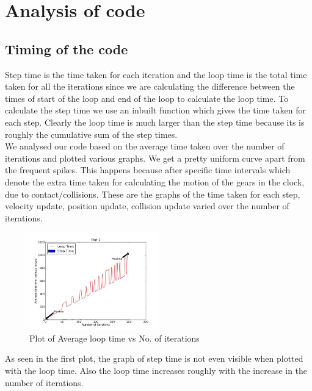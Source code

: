 \documentclass[10pt]{article} \usepackage[a4paper,left=0.8in,right=0.8in,top=0.4in,bottom=0.8in]{geometry} \usepackage{graphicx}
\begin{document}
\section{Analysis of code}
\subsection{Timing of the code}
Step time is the time taken for each iteration and the loop time is the total time taken for all the iterations since we are calculating the difference between the times of start of the loop and end of the loop to calculate the loop time. To calculate the step time we use an inbuilt function which gives the time taken for each step. Clearly the loop time is much larger than the step time because its is roughly the cumulative sum of the step times.\\
We analysed our code based on the average time taken over the number of iterations and plotted various graphs. We get a pretty uniform curve apart from the frequent spikes. This happens because after specific time intervals which denote the extra time taken for calculating the motion of the gears in the clock, due to contact/collisions. These are the graphs of the time taken for each step, velocity update, position update, collision update varied over the number of iterations.

\begin{figure}[ht!]
\centering
\includegraphics[width=0.5\textwidth]{images/plot1.jpg}
\caption{Plot of Average loop time vs No. of iterations}
\end{figure}
As seen in the first plot, the graph of step time is not even visible when plotted with the loop time. Also the loop time increases roughly with the increase in the number of iterations.
\end{document}
